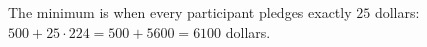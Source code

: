 The minimum is when every participant pledges exactly $25$ dollars: $500+25\cdot224=500+5600=\boxed{6100}$ dollars.
